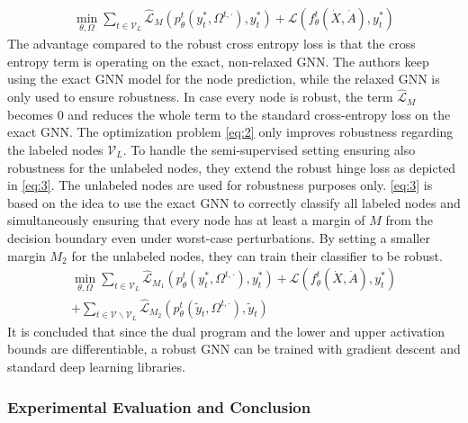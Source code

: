 \documentclass[a4paper,preprint]{sig-alternate}
\begin{document}
\begin{gather}
\label{eq:2}
    \min_{\theta, \Omega} \sum_{t \in \mathcal{V}_L} \mathcal{\hat{L}}_M (p_{\theta}^t (y_t^{\ast}, \Omega^{t, \cdot}), y_t^{\ast}) + \mathcal{L} (f_{\theta}^t (\dot{X}, \dot{A}), y_t^{\ast})
\end{gather}
The advantage compared to the robust cross entropy loss is that the cross entropy term is operating on the exact, non-relaxed GNN.
The authors keep using the exact GNN model for the node prediction, while the relaxed GNN is only used to ensure robustness. 
In case every node is robust, the term $\mathcal{\hat{L}}_M$ becomes $0$ and reduces the whole term to the standard cross-entropy loss 
on the exact GNN.\newline
The optimization problem \ref{eq:2} only improves robustness regarding the labeled nodes $\mathcal{V}_L$.
To handle the semi-supervised setting ensuring also robustness for the unlabeled nodes, they extend the robust hinge loss
as depicted in \ref{eq:3}. The unlabeled nodes are used for robustness purposes only. 
\ref{eq:3} is based on the idea to use the exact GNN to correctly classify all labeled nodes and simultaneously ensuring that
every node has at least a margin of $M$ from the decision boundary even under worst-case perturbations.
By setting a smaller margin $M_2$ for the unlabeled nodes, they can train their classifier to be robust.
\begin{multline}
\label{eq:3}
    \min_{\theta, \Omega} \sum_{t \in \mathcal{V}_L} \mathcal{\hat{L}}_{M_1} (p_{\theta}^t (y_t^{\ast}, \Omega^{t, \cdot}), y_t^{\ast}) + \mathcal{L} (f_{\theta}^t (\dot{X}, \dot{A}), y_t^{\ast}) \\
    + \sum_{t \in \mathcal{V} \backslash \mathcal{V}_L} \mathcal{\hat{L}}_{M_2} (p_{\theta}^t (\tilde{y}_t, \Omega^{t, \cdot}), \tilde{y}_t)
\end{multline}
It is concluded that since the dual program and the lower and upper activation bounds are differentiable, a robust GNN can be 
trained with gradient descent and standard deep learning libraries.

\subsubsection{Experimental Evaluation and Conclusion}
\end{document}
